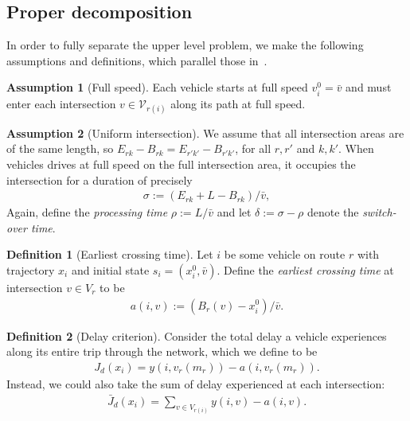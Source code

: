 \documentclass{report}
\theoremstyle{definition}
\newtheorem{define}{Definition}[chapter]
\newtheorem{assump}{Assumption}[chapter]
\theoremstyle{plain}
\begin{document}
\subsection{Proper decomposition}
In order to fully separate the upper level problem, we make the following
assumptions and definitions, which parallel those in~.

\begin{assump}[Full speed]
  Each vehicle starts at full speed $v_i^0 = \bar{v}$ and must enter each
  intersection $v \in \mathcal{V}_{r(i)}$ along its path at full speed.
\end{assump}

\begin{assump}[Uniform intersection]
  We assume that all intersection areas are of the same length, so
  $E_{rk} - B_{rk} = E_{r'k'} - B_{r'k'}$, for all $r, r'$ and $k,k'$. When
  vehicles drives at full speed on the full intersection area, it occupies the
  intersection for a duration of precisely
  \begin{align}
    \sigma := (E_{rk} + L - B_{rk}) / \bar{v} ,
  \end{align}
  Again, define the \emph{processing time} $\rho := L / \bar{v}$ and let $\delta := \sigma - \rho$
  denote the \emph{switch-over time}.
\end{assump}

\begin{define}[Earliest crossing time]
  Let $i$ be some vehicle on route $r$ with trajectory $x_i$ and initial state
  $s_i = (x_i^0, \bar{v})$. Define the \emph{earliest crossing time} at intersection
  $v \in V_{r}$ to be
  \begin{align}
    a(i, v) := (B_{r}(v) - x_i^0) / \bar{v}.
  \end{align}
\end{define}

\begin{define}[Delay criterion]
  Consider the total delay a vehicle experiences along its entire trip through
  the network, which we define to be
  \begin{align}
    J_d(x_i) = y(i, v_r(m_r)) - a(i, v_r(m_r)) .
  \end{align}
  Instead, we could also take the sum of delay experienced at each intersection:
  \begin{align}
    \bar{J}_{d}(x_i) = \sum_{v \in V_{r(i)}} y(i, v) - a(i, v) .
  \end{align}
\end{define}
\end{document}
